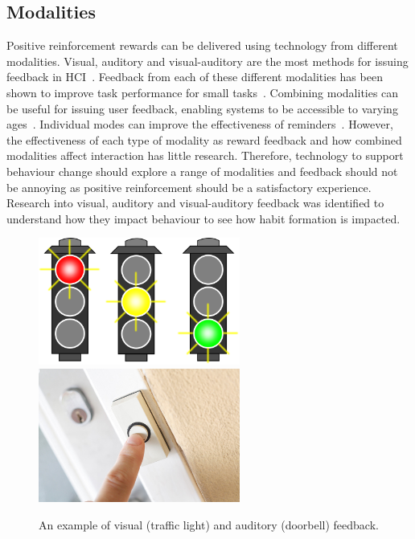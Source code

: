 
\subsection{Modalities}
Positive reinforcement rewards can be delivered using technology from different modalities. Visual, auditory and visual-auditory are the most methods for issuing feedback in HCI~\cite{desinging_interface_speech_tech}. Feedback from each of these different modalities has been shown to improve task performance for small tasks~\cite{chi_oussama_tap_the_shapetones}. Combining modalities can be useful for issuing user feedback, enabling systems to be accessible to varying ages~\cite{article_user_centred_multimodal_reminders}. Individual modes can improve the effectiveness of reminders~\cite{multi_modal_reminders_less_disruptive, article_designing_multimodal_reminders_for_home}. However, the effectiveness of each type of modality as reward feedback and how combined modalities affect interaction has little research. Therefore, technology to support behaviour change should explore a range of modalities and feedback should not be annoying as positive reinforcement should be a satisfactory experience. Research into visual, auditory and visual-auditory feedback was identified to understand how they impact behaviour to see how habit formation is impacted.

\begin{figure}[H]
  \centering
  \includegraphics[width=2.6in]{../resources/visual.png}
  \hspace{10px}
  \includegraphics[width=2.6in]{../resources/audio.png}
  \caption{An example of visual (traffic light) and auditory (doorbell) feedback.}
  \label{fig:visual_audio}
\end{figure}

